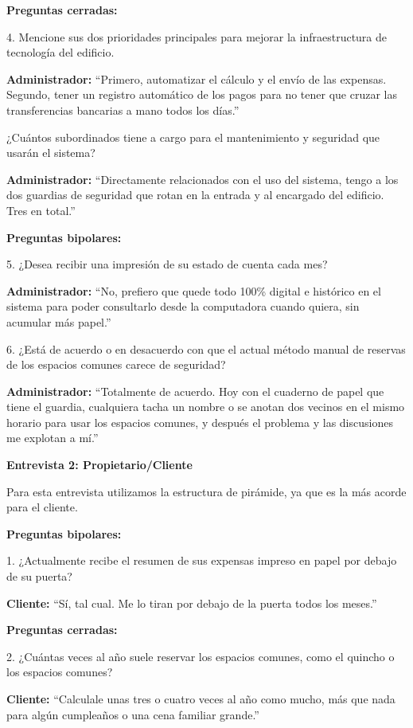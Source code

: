 \textbf{Preguntas cerradas:}

4. Mencione sus dos prioridades principales para mejorar la infraestructura de tecnología del edificio.

\textbf{Administrador:} ``Primero, automatizar el cálculo y el envío de las expensas. Segundo, tener un registro automático de los pagos para no tener que cruzar las transferencias bancarias a mano todos los días.''   

¿Cuántos subordinados tiene a cargo para el mantenimiento y seguridad que usarán el sistema?  

\textbf{Administrador:} ``Directamente relacionados con el uso del sistema, tengo a los dos guardias de seguridad que rotan en la entrada y al encargado del edificio. Tres en total.''   

\textbf{Preguntas bipolares:} 

5. ¿Desea recibir una impresión de su estado de cuenta cada mes?

\textbf{Administrador:} ``No, prefiero que quede todo 100\% digital e histórico en el sistema para poder consultarlo desde la computadora cuando quiera, sin acumular más papel.'' 

6. ¿Está de acuerdo o en desacuerdo con que el actual método manual de reservas de los espacios comunes carece de seguridad?

\textbf{Administrador:} ``Totalmente de acuerdo. Hoy con el cuaderno de papel que tiene el guardia, cualquiera tacha un nombre o se anotan dos vecinos en el mismo horario para usar los espacios comunes, y después el problema y las discusiones me explotan a mí.'' 

\vspace{0.5cm}
\textbf{Entrevista 2: Propietario/Cliente}

Para esta entrevista utilizamos la estructura de pirámide, ya que es la más acorde para el cliente.  

\textbf{Preguntas bipolares:}

1. ¿Actualmente recibe el resumen de sus expensas impreso en papel por debajo de su puerta? 

\textbf{Cliente:} ``Sí, tal cual. Me lo tiran por debajo de la puerta todos los meses.''  

\textbf{Preguntas cerradas:}

2. ¿Cuántas veces al año suele reservar los espacios comunes, como el quincho o los espacios comunes? 

\textbf{Cliente:} ``Calculale unas tres o cuatro veces al año como mucho, más que nada para algún cumpleaños o una cena familiar grande.''  

